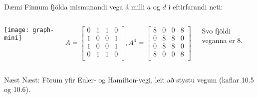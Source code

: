 \documentclass{beamer}
\begin{document}
\begin{frame}{Dæmi}
Finnum fjölda mismunandi vega á milli $a$ og $d$ í eftirfarandi neti:
\begin{columns}
\begin{center}
\texttt{[image: graph-mini]}
\end{center}
\[
A =
\begin{bmatrix}
0&1&1&0\\
1&0&0&1\\
1&0&0&1\\
0&1&1&0\\
\end{bmatrix}
,
A^4 =
\begin{bmatrix}
8&0&0&8\\
0&8&8&0\\
0&8&8&0\\
8&0&0&8\\
\end{bmatrix}
\]
\begin{center}
Svo fjöldi veganna er 8.
\end{center}
\end{columns}
\end{frame}

\begin{frame}{Næst}
Næst: Förum yfir Euler- og Hamilton-vegi, leit að stystu vegum (kaflar 10.5 og 10.6).
\end{frame}
\end{document}
